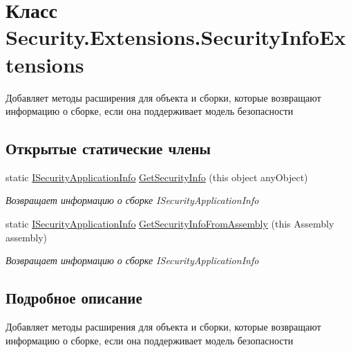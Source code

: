 \hypertarget{class_security_1_1_extensions_1_1_security_info_extensions}{}\section{Класс Security.\+Extensions.\+Security\+Info\+Extensions}
\label{class_security_1_1_extensions_1_1_security_info_extensions}


Добавляет методы расширения для объекта и сборки, которые возвращают информацию о сборке, если она поддерживает модель безопасности  


\subsection*{Открытые статические члены}
\begin{DoxyCompactItemize}
\item 
static \hyperlink{interface_security_1_1_interfaces_1_1_i_security_application_info}{I\+Security\+Application\+Info} \hyperlink{class_security_1_1_extensions_1_1_security_info_extensions_a72e7bdabf7e7212e9843949109e45ed0}{Get\+Security\+Info} (this object any\+Object)
\begin{DoxyCompactList}\small\item\em Возвращает информацию о сборке I\+Security\+Application\+Info \end{DoxyCompactList}\item 
static \hyperlink{interface_security_1_1_interfaces_1_1_i_security_application_info}{I\+Security\+Application\+Info} \hyperlink{class_security_1_1_extensions_1_1_security_info_extensions_a9b6d1c776be015ef384ffb3f65ab7b14}{Get\+Security\+Info\+From\+Assembly} (this Assembly assembly)
\begin{DoxyCompactList}\small\item\em Возвращает информацию о сборке I\+Security\+Application\+Info \end{DoxyCompactList}\end{DoxyCompactItemize}


\subsection{Подробное описание}
Добавляет методы расширения для объекта и сборки, которые возвращают информацию о сборке, если она поддерживает модель безопасности 



